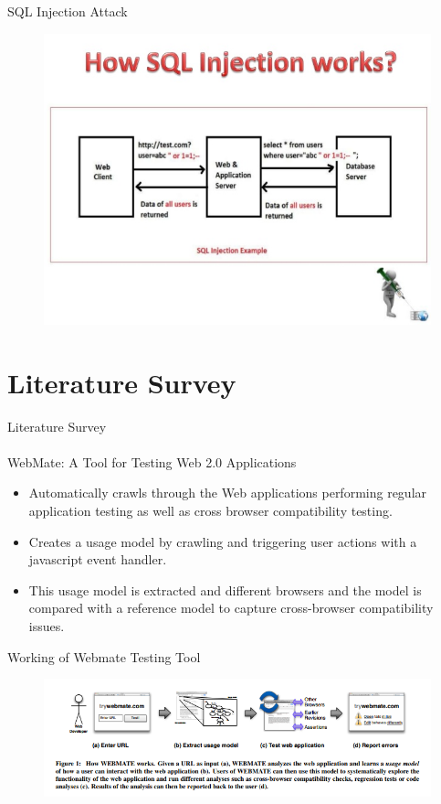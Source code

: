 \documentclass{beamer}
\begin{document}
\begin{frame}{SQL Injection Attack}
 \begin{figure}[h]
    \centering
    \includegraphics[scale=0.4]{MTP6.jpg}
\end{figure}
\end{frame}


\section{Literature Survey}
\begin{frame}{Literature Survey\\\\WebMate: A Tool for Testing Web 2.0 Applications}
\begin{itemize}
    \item Automatically crawls through the Web applications performing regular application testing as well as cross browser compatibility testing.
    \item Creates a usage model by crawling and triggering user actions with a javascript event handler.
    \item This usage model is extracted and different browsers and the model is compared with a reference model to capture cross-browser compatibility issues.
\end{itemize}
\end{frame}

\begin{frame}{Working of Webmate Testing Tool}
 \begin{figure}[h]
    \centering
    \includegraphics[scale=0.6]{MTP1.png}
\end{figure}
\end{frame}
\end{document}
